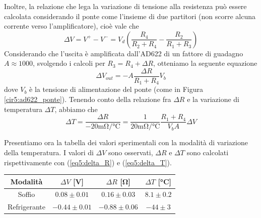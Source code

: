 Inoltre, la relazione che lega la variazione di tensione alla resistenza può essere calcolata considerando il ponte come l'insieme di due partitori (non scorre alcuna corrente verso l'amplificatore), cioè vale che
$$\Delta V = V^+ - V^- = V_d \left(\frac{R_4}{R_2+R_4}-\frac{R_2}{R_1+R_3}\right)$$
Considerando che l'uscita è amplificata dall'AD622 di un fattore di guadagno $A \approx 1000$, svolgendo i calcoli per $R_3=R_4+\Delta R$, otteniamo la seguente equazione
\begin{equation}
\Delta V_{out} = - A \frac{\Delta R}{R_1+R_4} V_{b}
\label{eq5:delta_R}
\end{equation}
dove $V_{b}$ è la tensione di alimentazione del ponte (come in Figura \ref{cir5:ad622_ponte}). Tenendo conto della relazione fra $\Delta R$ e la variazione di temperatura $\Delta T$, abbiamo che
\begin{equation}
\Delta T = \frac{\Delta R}{- 20 \si{\milli\ohm/\celsius}} = \frac{1}{20 \si{\milli\ohm/\celsius}} \frac{R_1+R_4}{V_b A} \Delta V
\label{eq5:delta_T}
\end{equation}

Presentiamo ora la tabella dei valori sperimentali con la modalità di variazione della temperatura. I valori di $\Delta V$ sono osservati, $\Delta R$ e $\Delta T$ sono calcolati rispettivamente con (\ref{eq5:delta_R}) e (\ref{eq5:delta_T}).

\begin{center}
{\renewcommand{\arraystretch}{1.2}%
	\begin{tabular}{c|c|c|c}
	Modalità & $\Delta V$ [\si{\volt}] & $\Delta R$ [\si{\ohm}] & $\Delta T$ [\si{\celsius}]\\
    \hline
	Soffio & $0.08\pm0.01 $ & $0.16\pm0.03$ & $8.1 \pm 0.2$\\
    \hline
	Refrigerante & $-0.44\pm0.01 $ & $-0.88\pm0.06$ & $-44 \pm 3$\\
	\end{tabular}
}
\end{center}